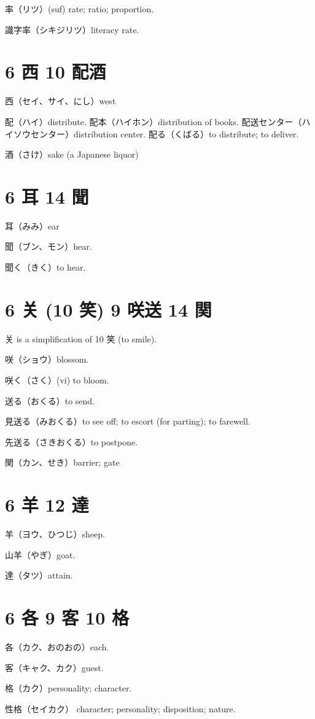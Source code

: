 率（リツ）(suf) rate; ratio; proportion.

識字率（シキジリツ）literacy rate.

\section{6 西 10 配酒}

西（セイ、サイ、にし）west

配（ハイ）distribute.
配本（ハイホン）distribution of books.
配送センター（ハイソウセンター）distribution center.
配る（くばる）to distribute; to deliver.

酒（さけ）sake (a Japanese liquor)

\section{6 耳 14 聞}

耳（みみ）ear

聞（ブン、モン）hear.

聞く（きく）to hear.

\section{6 关 (10 笑) 9 咲送 14 関}

关 is a simplification of 10 笑 (to smile).

咲（ショウ）blossom.

咲く（さく）(vi) to bloom.

送る（おくる）to send.

見送る（みおくる）to see off; to escort (for parting); to farewell.

先送る（さきおくる）to postpone.

関（カン、せき）barrier; gate

\section{6 羊 12 達}

羊（ヨウ、ひつじ）sheep.

山羊（やぎ）goat.

達（タツ）attain.

\section{6 各 9 客 10 格}

各（カク、おのおの）each.

客（キャク、カク）guest.

格（カク）personality; character.

性格（セイカク）
character; personality; disposition; nature.
